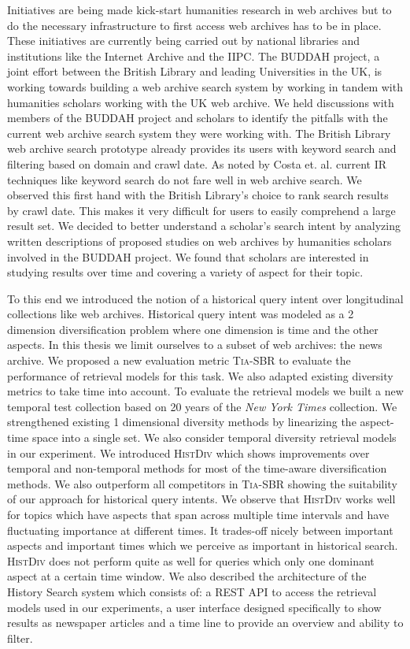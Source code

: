 Initiatives are being made kick-start humanities research in web archives but to do the necessary infrastructure to first access web archives has to be in place. These initiatives are currently being carried out by national libraries and institutions like the Internet Archive and the IIPC. The BUDDAH project, a joint effort between the British Library and leading Universities in the UK, is working towards building a web archive search system by working in tandem with humanities scholars working with the UK web archive. We held discussions with members of the BUDDAH project and scholars to identify the pitfalls with the current web archive search system they were working with. The British Library web archive search prototype already provides its users with keyword search and filtering based on domain and crawl date. As noted by Costa et. al. current IR techniques like keyword search do not fare well in web archive search. We observed this first hand with the British Library's choice to rank search results by crawl date. This makes it very difficult for users to easily comprehend a large result set. We decided to better understand a scholar's search intent by analyzing written descriptions of proposed studies on web archives by humanities scholars involved in the BUDDAH project. We found that scholars are interested in studying results over time and covering a variety of aspect for their topic. 

To this end we introduced the notion of a historical query intent over longitudinal collections like web archives. Historical query intent was modeled as a 2 dimension diversification problem where one dimension is time and the other aspects. In this thesis we limit ourselves to a subset of web archives: the news archive. We proposed a new evaluation metric \textsc{Tia-SBR} to evaluate the performance of retrieval models for this task. We also adapted existing diversity metrics to take time into account. To evaluate the retrieval models we built a new temporal test collection based on 20 years of the \emph{New York Times} collection. We strengthened existing 1 dimensional diversity methods by linearizing the aspect-time space into a single set. We also consider temporal diversity retrieval models in our experiment. We introduced \textsc{HistDiv} which shows improvements over temporal and non-temporal methods for most of the time-aware diversification methods. We also outperform all competitors in \textsc{Tia-SBR} showing the suitability of our approach for historical query intents. We observe that \textsc{HistDiv} works well for topics which have aspects that span across multiple time intervals and have fluctuating importance at different times. It trades-off nicely between important aspects and important times which we perceive as important in historical search. \textsc{HistDiv} does not perform quite as well for queries which only one dominant aspect at a certain time window. We also described the architecture of the History Search system which consists of: a REST API to access the retrieval models used in our experiments, a user interface designed specifically to show results as newspaper articles and a time line to provide an overview and ability to filter.

